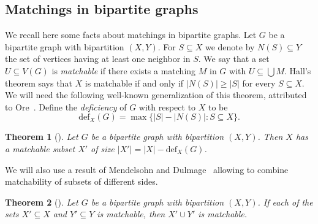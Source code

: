 \documentclass{article}
\newtheorem{theorem}{Theorem}[section]
\theoremstyle{definition}
\begin{document}
\subsection{Matchings in bipartite graphs}
We recall here some facts about matchings in bipartite graphs. Let $G$ be a bipartite graph with bipartition $(X, Y)$. For $S \subseteq X$ we denote by $N(S) \subseteq Y$ the set of vertices having at least one neighbor in $S$. We say that a set $U \subseteq V(G)$ is \emph{matchable} if there exists a matching $M$ in $G$ with $U \subseteq \bigcup M$. Hall's theorem says that $X$ is matchable if and only if $|N(S)| \ge |S|$ for every $S \subseteq X$. We will need the following well-known generalization of this theorem, attributed to Ore~\cite{Ore}. Define the \emph{deficiency} of $G$ with respect to $X$ to be \[ \mathrm{def}_X(G) = \max \{|S| - |N(S)|: S \subseteq X\}.\]
\begin{theorem}[{\cite{Ore}}] \label{thm:DEF}
Let $G$ be a bipartite graph with bipartition $(X, Y)$. Then $X$ has a matchable subset $X'$ of size $|X'| = |X| - \mathrm{def}_X(G)$.
\end{theorem}
We will also use a result of Mendelsohn and Dulmage~\cite{MD} allowing to combine matchability of subsets of different sides.
\begin{theorem}[{\cite{MD}}] \label{thm:MD}
Let $G$ be a bipartite graph with bipartition $(X, Y)$. If each of the sets $X' \subseteq X$ and $Y' \subseteq Y$ is matchable, then $X' \cup Y'$ is matchable.
\end{theorem}
\end{document}
